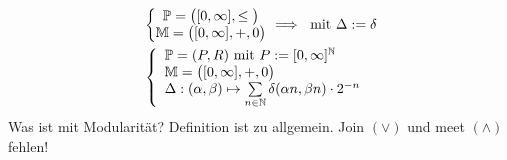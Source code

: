 \begin{beispiel}
\begin{align*}
&\left\lbrace\begin{matrix}
\mathbb{P}=\big([0,\infty],\leq\big)\\
\mathbb{M}=\big([0,\infty],+,0\big)
\end{matrix}\right.\implies \text{ mit }\Delta:=\delta\\
&\left\lbrace\begin{array}{l}
\mathbb{P}=(P,R)\text{ mit } P:=[0,\infty]^{\mathbb{N}}\\
\mathbb{M}=\big([0,\infty],+,0\big)\\
\Delta:(\alpha,\beta)\mapsto\sum\limits_{n\in\mathbb{N}}\delta(\alpha n,\beta n)\cdot 2^{-n}
\end{array}\right.
\end{align*}
Was ist mit Modularität? Definition ist zu allgemein. Join $(\vee)$ und meet $(\wedge)$ fehlen!
\end{beispiel}
